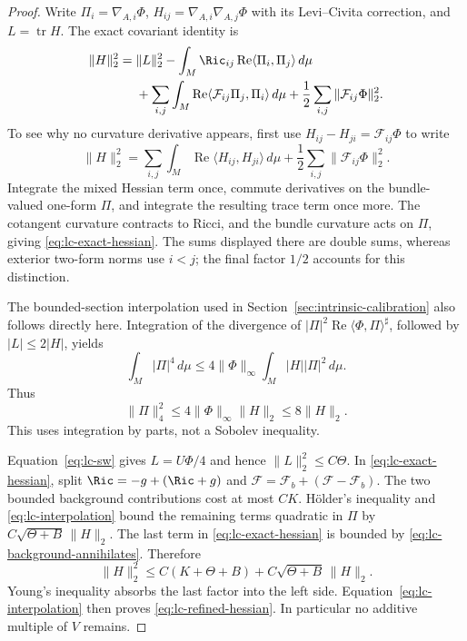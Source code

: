 \begin{proof}
Write $\Pi_i=\nabla_{A,i}\Phi$, $H_{ij}=\nabla_{A,i}\nabla_{A,j}\Phi$
with its Levi--Civita correction, and $L=\operatorname{tr}H$.
The exact covariant identity is
\begin{equation}\label{eq:lc-exact-hessian}
\begin{split}
 \|H\|_2^2={}&\|L\|_2^2
 -\int_M\Ric_{ij}\operatorname{Re}\langle\Pi_i,\Pi_j\rangle\,d\mu\\
 &+\sum_{i,j}\int_M\operatorname{Re}
                  \langle\mathcal F_{ij}\Pi_j,\Pi_i\rangle\,d\mu
 +\frac12\sum_{i,j}\|\mathcal F_{ij}\Phi\|_2^2.
\end{split}
\end{equation}
To see why no curvature derivative appears, first use
$H_{ij}-H_{ji}=\mathcal F_{ij}\Phi$ to write
\[
 \|H\|_2^2
 =\sum_{i,j}\int_M\operatorname{Re}\langle H_{ij},H_{ji}\rangle\,d\mu
  +\frac12\sum_{i,j}\|\mathcal F_{ij}\Phi\|_2^2.
\]
Integrate the mixed Hessian term once, commute derivatives on the
bundle-valued one-form $\Pi$, and integrate the resulting trace term
once more.  The cotangent curvature contracts to Ricci, and the bundle
curvature acts on $\Pi$, giving \eqref{eq:lc-exact-hessian}.  The
sums displayed there are double sums, whereas exterior two-form norms
use $i<j$; the final factor $1/2$ accounts for this distinction.

The bounded-section interpolation used in
Section~\ref{sec:intrinsic-calibration} also follows directly here.
Integration of the divergence of
$|\Pi|^2\operatorname{Re}\langle\Phi,\Pi\rangle^\sharp$, followed
by $|L|\le2|H|$, yields
\[
 \int_M|\Pi|^4\,d\mu
 \le4\|\Phi\|_\infty\int_M|H||\Pi|^2\,d\mu.
\]
Thus
\begin{equation}\label{eq:lc-interpolation}
 \|\Pi\|_4^2\le4\|\Phi\|_\infty\|H\|_2\le8\|H\|_2.
\end{equation}
This uses integration by parts, not a Sobolev inequality.

Equation~\eqref{eq:lc-sw} gives $L=U\Phi/4$ and hence
$\|L\|_2^2\le C\Theta$.  In \eqref{eq:lc-exact-hessian}, split
$\Ric=-g+(\Ric+g)$ and
$\mathcal F=\mathcal F_b+(\mathcal F-\mathcal F_b)$.
The two bounded background contributions cost at most $CK$.
H\"older's inequality and \eqref{eq:lc-interpolation} bound the
remaining terms quadratic in $\Pi$ by
$C\sqrt{\Theta+B}\,\|H\|_2$.  The last term in
\eqref{eq:lc-exact-hessian} is bounded by
\eqref{eq:lc-background-annihilates}.  Therefore
\[
 \|H\|_2^2\le C(K+\Theta+B)
                 +C\sqrt{\Theta+B}\,\|H\|_2.
\]
Young's inequality absorbs the last factor into the left side.
Equation~\eqref{eq:lc-interpolation} then proves
\eqref{eq:lc-refined-hessian}.  In particular no additive multiple
of $V$ remains.
\end{proof}

